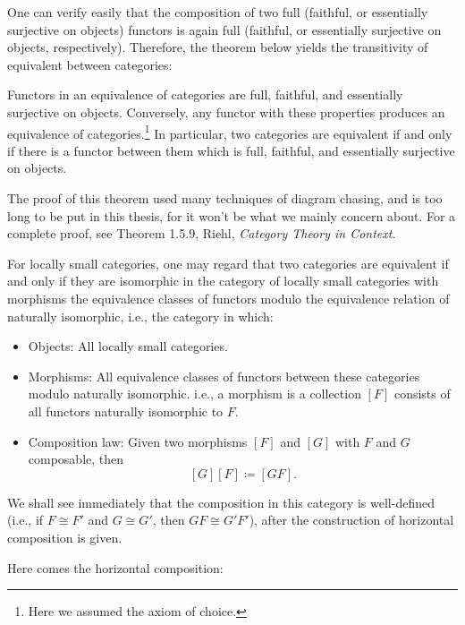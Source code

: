 	One can verify easily that the composition of two full (faithful, or essentially surjective on objects) functors is again full (faithful, or essentially surjective on objects, respectively). Therefore, the theorem below yields the transitivity of equivalent between categories:
	\begin{theorem}
		Functors in an equivalence of categories are full, faithful, and essentially surjective on objects. Conversely, any functor with these properties produces an equivalence of categories.\footnote{Here we assumed the axiom of choice.} In particular, two categories are equivalent if and only if there is a functor between them which is full, faithful, and essentially surjective on objects.
	\end{theorem}
	The proof of this theorem used many techniques of diagram chasing, and is too long to be put in this thesis, for it won't be what we mainly concern about. For a complete proof, see Theorem 1.5.9, Riehl, \textsl{Category Theory in Context}.
	\begin{remark}
		For locally small categories, one may regard that two categories are equivalent if and only if they are isomorphic in the category of locally small categories with morphisms the equivalence classes of functors modulo the equivalence relation of naturally isomorphic, i.e., the category in which:
		\begin{itemize}
			\item Objects: All locally small categories.
			\item Morphisms: All equivalence classes of functors between these categories modulo naturally isomorphic. i.e., a morphism is a collection $[F]$ consists of all functors naturally isomorphic to $F$.
			\item Composition law: Given two morphisms $[F]$ and $[G]$ with $F$ and $G$ composable, then 
			\[[G][F]\coloneqq [GF].\]
		\end{itemize}
		We shall see immediately that the composition in this category is well-defined (i.e., if $F\cong F'$ and $G\cong G'$, then $GF\cong G'F'$), after the construction of horizontal composition is given.
	\end{remark}
	Here comes the horizontal composition:
